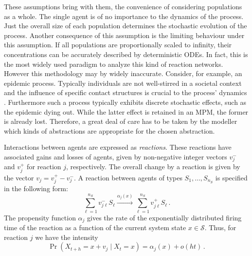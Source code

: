 These assumptions bring with them, the convenience of considering populations as a whole.
The single agent is of no importance to the dynamics of the process.
Just the overall size of each population determines the stochastic evolution of the process.
Another consequence of this assumption is the limiting behaviour under this assumption.
If all populations are proportionally scaled to infinity, their concentrations can be accurately described by deterministic \acp{ODE}\@.
In fact, this is the most widely used paradigm to analyze this kind of reaction networks.
However this methodology may by widely inaccurate.
Consider, for example, an epidemic process.
Typically individuals are not well-stirred in a societal context and the influence of specific
contact structures is crucial to the process' dynamics \parencite{grossmann2020importance,grossmann2021heterogeneity}.
Furthermore such a process typically exhibits discrete stochastic effects, such as the epidemic dying out.
While the latter effect is retained in an \ac{MPM}, the former is already lost.
Therefore, a great deal of care has to be taken by the modeller which kinds of abstractions are appropriate for the chosen abstraction.

Interactions between agents are expressed as \emph{reactions}.
These reactions have associated
gains and losses of agents, given by non-negative integer vectors
${v}_j^{-}$ and ${v}_j^{+}$ for reaction $j$, respectively. The overall change by a reaction is given by the vector $v_j = v_j^+ - v_j^-$.
A reaction between agents of types $S_1,\dots, S_{n_S}$ is specified in the following form:
\begin{equation}\label{eq:reaction}
    \sum_{\ell=1}^{n_S} v_{j\ell}^{-} S_\ell
    \xrightarrow{\alpha_j( x)}
    \sum_{\ell=1}^{n_S} v_{j\ell}^{+} S_\ell\,.
\end{equation}
The propensity function $\alpha_j$ gives the rate of the exponentially distributed firing
time of the reaction as a function of the current system state $x\in \mathcal{S}$.
Thus, for reaction $j$ we have the intensity
\begin{equation}\label{eq:firing}
    \Pr\left(X_{t+h}=x+v_j\mid X_{t}=x\right)
    =
    \alpha_j(x) + o(h t)\,.
\end{equation}


